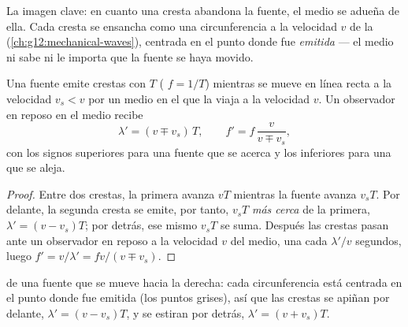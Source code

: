 La imagen clave: en cuanto una cresta abandona la fuente, el medio se
adueña de ella. Cada cresta se ensancha como una circunferencia a la
velocidad $v$ de la  (\cref{ch:g12:mechanical-waves}), centrada en
el punto donde fue \emph{emitida} --- el medio ni sabe ni le importa que
la fuente se haya movido.

\begin{proposition}\label{prop:g12:doppler-effect:moving-source}
Una fuente emite crestas con  $T$ ( $f = 1/T$) mientras
se mueve en línea recta a la velocidad $v_s < v$ por un medio en el que
la  viaja a la velocidad $v$. Un observador en reposo en el medio
recibe
\[
\lambda' = (v \mp v_s)\,T, \qquad f' = f\,\frac{v}{v \mp v_s},
\]
con los signos superiores para una fuente que se acerca y los
inferiores para una que se aleja.
\end{proposition}

\begin{proof}
Entre dos crestas, la primera avanza $vT$ mientras la fuente avanza
$v_s T$. Por delante, la segunda cresta se emite, por tanto, $v_s T$
\emph{más cerca} de la primera, $\lambda' = (v - v_s)T$; por detrás, ese
mismo $v_s T$ se suma. Después las crestas pasan ante un observador en
reposo a la velocidad $v$ del medio, una cada $\lambda'/v$ segundos,
luego $f' = v/\lambda' = f v/(v \mp v_s)$.
\end{proof}

\begin{omfigure}

{\small {} de una fuente que se mueve hacia la derecha:
cada circunferencia está centrada en el punto donde fue emitida (los
puntos grises), así que las crestas se apiñan por delante,
$\lambda' = (v - v_s)T$, y se estiran por detrás,
$\lambda' = (v + v_s)T$.}
\end{omfigure}

